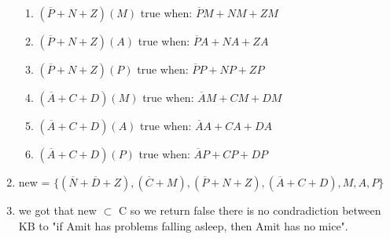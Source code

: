 \documentclass{article}
\begin{document}
\begin{enumerate}
\begin{enumerate}
        \item $(\overline P + N + Z)(M)$ true when: $\overline P M + NM + ZM$
        \item $(\overline P + N + Z)(A)$ true when: $\overline P A + NA + ZA$
        \item $(\overline P + N + Z)(P)$ true when: $\overline P P + NP + ZP$
        \item $(\overline A + C + D)(M)$ true when: $\overline A M + C M + D M$
        \item $(\overline A + C + D)(A)$ true when: $\overline A A + C A + D A$
        \item $(\overline A + C + D)(P)$ true when: $\overline A P + C P + D P$
    \end{enumerate}
    \item new = $\{(\overline N + \overline D + Z), ( \overline C + M ),(\overline P + N + Z),(\overline A + C + D), M,A,P\}$
    \item we got that new $\subset$ C so we return false
    there is no condradiction between KB to "if Amit has problems falling asleep, then Amit has no mice".
\end{enumerate}
\end{document}
